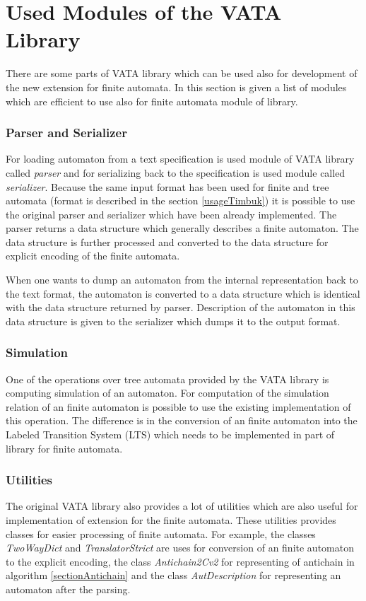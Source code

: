 \section{Used Modules of the VATA Library}
There are some parts of VATA library which can be used also for development of the new extension for finite automata. In this section is given a list of modules
which are efficient to use also for finite automata module of library.

\subsubsection{Parser and Serializer}
For loading automaton from a text specification is used module of VATA library called \emph{parser} and for serializing back to the specification is used
module called \emph{serializer}. Because the same input format has been used for finite and tree automata (format is described in the section \ref{usageTimbuk})
it is possible to use the original parser and serializer which have been already implemented. 
The parser returns a data structure which generally describes a finite automaton. The data structure is further processed and converted 
to the data structure for explicit encoding of the finite automata. 

When one wants to dump an automaton from the internal representation back to the text format, 
the automaton is converted to a data structure which is identical with the data structure returned by parser. Description of the automaton in this
data structure is given to the serializer which dumps it to the output format.

\subsubsection{Simulation}
One of the operations over tree automata provided by the VATA library is computing simulation of an automaton. For computation of the simulation relation
of an finite automaton is possible to use the existing implementation of this operation. 
The difference is in the conversion of an finite automaton into the Labeled Transition System (LTS) which
needs to be implemented in part of library for finite automata.

\subsubsection{Utilities}
The original VATA library also provides a lot of utilities which are also useful for implementation of extension for the finite automata. These utilities
provides classes for easier processing of finite automata. For example, the classes \emph{TwoWayDict} and \emph{TranslatorStrict} are uses for conversion
of an finite automaton to the explicit encoding, the class \emph{Antichain2Cv2} for representing of antichain in algorithm \ref{sectionAntichain} 
and the class \emph{AutDescription} for representing an automaton after the parsing.

